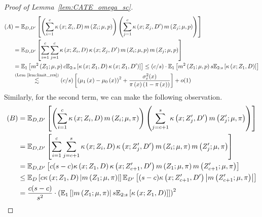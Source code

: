 \begin{proof}[Proof of Lemma~\ref{lem:CATE_omega_sc}]
\begin{equation}
\begin{aligned}
            (A)
            & = \mathbb{E}_{D, D^{\prime}}\left[\left(\sum_{i = 1}^{c} \kappa\left(x; Z_{i}, D\right) m\left(Z_{i}; \mu, p\right)\right)
            \left(\sum_{j = 1}^{c} \kappa\left(x; Z_{j}, D^{\prime}\right) m\left(Z_{j}; \mu, p\right)\right)\right] \\
			& = \mathbb{E}_{D, D^{\prime}}\left[
				\sum_{i = 1}^{c} \sum_{j = 1}^{c} \kappa\left(x; Z_{i}, D\right)\kappa\left(x; Z_{j}, D^{\prime}\right) m\left(Z_{i}; \mu, p\right)m\left(Z_{j}; \mu, p\right)
			\right] \\
			& = \mathbb{E}_{1}\left[m^{2}\left(Z_{1}; \mu, p\right) c \mathbb{E}_{2:s}\left[\kappa\left(x; Z_{1}, D\right)\kappa\left(x; Z_{1}, D^{\prime}\right)\right]\right]
			\leq (c/s) \cdot \mathbb{E}_{1}\left[m^{2}\left(Z_{1}; \mu, p\right) s \mathbb{E}_{2:s}\left[\kappa\left(x; Z_{1}, D\right)\right]\right]\\
			& \overset{\text{(Lem~\ref{lem:limit_res})}}{\lesssim} (c/s) \left[\left(\mu_1\left(x\right) - \mu_0\left(x\right)\right)^2 + \frac{\sigma_{\varepsilon}^2(x)}{\pi\left(x\right)\left(1 - \pi\left(x\right)\right)}\right] + o(1)
        \end{aligned}
    \end{equation}
	Similarly, for the second term, we can make the following observation.
	\begin{equation}
		\begin{aligned}
			(B) 
			& = \E_{D, D^{\prime}}\left[\left(\sum_{i = 1}^{c} \kappa\left(x; Z_{i}, D\right) m\left(Z_{i}; \mu, \pi\right)\right)
            \left(\sum_{j = c + 1}^{s} \kappa\left(x; Z_{j}^{\prime}, D^{\prime}\right) m\left(Z_{j}^{\prime}; \mu, \pi\right)\right)\right] \\
			& = \E_{D,D^{\prime}}\left[\sum_{i = 1}^{c} \sum_{j = c + 1}^{s}\kappa\left(x; Z_{i}, D\right)\kappa\left(x; Z_{j}^{\prime}, D^{\prime}\right) 
			m\left(Z_{i}; \mu, \pi\right)m\left(Z_{j}^{\prime}; \mu, \pi\right)\right]\\
			& = \E_{D, D^{\prime}}\left[c (s-c) \kappa\left(x; Z_{1}, D\right)\kappa\left(x; Z_{c+1}^{\prime}, D^{\prime}\right) 
			m\left(Z_{1}; \mu, \pi\right) m\left(Z_{c+1}^{\prime}; \mu, \pi\right)\right]\\
			& \leq \E_{D}\left[c \kappa\left(x; Z_{1}, D\right)  \left|m\left(Z_{1}; \mu, \pi\right)\right|\right]
			\E_{D^{\prime}}\left[(s-c) \kappa\left(x; Z_{c+1}^{\prime}, D^{\prime}\right)  \left| m\left(Z_{c+1}^{\prime}; \mu, \pi\right) \right|\right]\\
			& = \frac{c(s-c)}{s^2} \cdot \left(\E_{1}\left[\left|m\left(Z_{1}; \mu, \pi\right)\right| s \E_{2:s}\left[\kappa\left(x; Z_{1}, D\right)\right]\right]\right)^2\\

\end{aligned}
\end{equation}
\end{proof}
